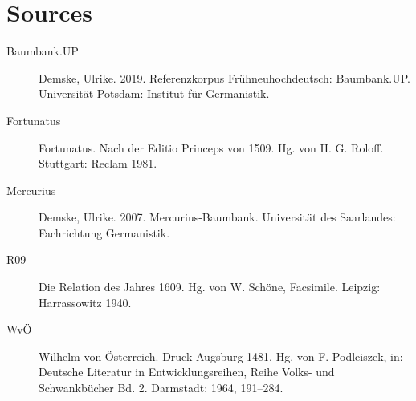 \documentclass[output=paper,colorlinks,citecolor=brown]{langscibook}
\begin{document}
\section*{Sources}


\begin{description}
\item[Baumbank.UP] Demske, Ulrike. 2019. Referenzkorpus Frühneuhochdeutsch: Baumbank.UP. Universität Potsdam: Institut für Germanistik.
\item[Fortunatus] Fortunatus. Nach der Editio Princeps von 1509. Hg. von H. G. Roloff. Stuttgart: Reclam 1981.
\item[Mercurius] Demske, Ulrike. 2007. Mercurius-Baumbank. Universität des Saarlandes: Fachrichtung Germanistik.
\item[R09] Die Relation des Jahres 1609. Hg. von W. Schöne, Facsimile. Leipzig: Harrassowitz 1940.
\item[WvÖ] Wilhelm von Österreich. Druck Augsburg 1481. Hg. von F. Podleiszek, in: Deutsche Literatur in Entwicklungsreihen, Reihe Volks- und Schwankbücher Bd. 2. Darmstadt: 1964, 191--284.
\end{description}


{\sloppy
\printbibliography[heading=subbibliography,notkeyword=this]
}
\end{document}
